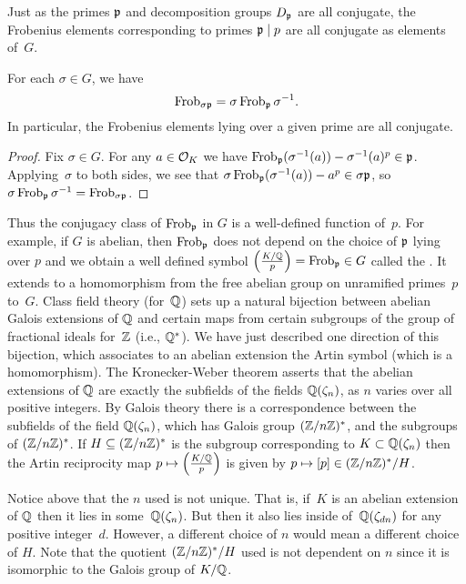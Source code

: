 Just as the primes $\mathfrak{p}$ and decomposition groups $D_{\mathfrak{p}}$ are all
conjugate, the Frobenius elements corresponding to primes
$\mathfrak{p}\mid p$ are all conjugate as elements of~$G$.

\begin{proposition}
For each $\sigma \in G$, we have
$$
 \operatorname{Frob}_{\sigma\mathfrak{p}} = \sigma\operatorname{Frob}_{\mathfrak{p}}\sigma^{-1}.
$$
In particular, the Frobenius elements lying over a given
prime are all conjugate.
\end{proposition}
\begin{proof}
Fix $\sigma\in G$. For any $a\in\mathcal{O}_K$ we have
$\operatorname{Frob}_{\mathfrak{p}}(\sigma^{-1}(a)) - \sigma^{-1}(a)^p \in \mathfrak{p}$.
Applying~$\sigma$ to both sides, we see that
$\sigma\operatorname{Frob}_{\mathfrak{p}}(\sigma^{-1}(a)) - a^p \in \sigma\mathfrak{p}$,
so $\sigma\operatorname{Frob}_{\mathfrak{p}}\sigma^{-1} = \operatorname{Frob}_{\sigma \mathfrak{p}}$.
\end{proof}

Thus the conjugacy class of $\operatorname{Frob}_{\mathfrak{p}}$ in $G$ is a well-defined
function of~$p$.  For example, if $G$ is abelian, then $\operatorname{Frob}_{\mathfrak{p}}$ does
not depend on the choice of $\mathfrak{p}$ lying over $p$ and we obtain a well
defined symbol $\left(\frac{K/\mathbb{Q}}{p}\right) =\operatorname{Frob}_{\mathfrak{p}}\in G$ called the .  It extends to a homomorphism from the free abelian
group on unramified primes~$p$ to~$G$.
Class field theory (for~$\mathbb{Q}$) sets up a natural bijection
between abelian Galois extensions of $\mathbb{Q}$ and certain maps from
certain subgroups of the group of fractional ideals for~$\mathbb{Z}$ (i.e., $\mathbb{Q}^*$).
  We have
just described one direction of this bijection, which associates to an
abelian extension the Artin symbol (which is a homomorphism).
The Kronecker-Weber theorem asserts that the abelian extensions of
$\mathbb{Q}$ are exactly the subfields of the fields $\mathbb{Q}(\zeta_n)$, as $n$
varies over all positive integers.  By Galois theory there is a
correspondence between the subfields of the field $\mathbb{Q}(\zeta_n)$,
which has Galois group $(\mathbb{Z}/n\mathbb{Z})^*$, and the subgroups of $(\mathbb{Z}/n\mathbb{Z})^*$.
If $H \subseteq (\mathbb{Z}/n\mathbb{Z})^*$ is the subgroup corresponding to
$K \subset \mathbb{Q}(\zeta_n)$ then the Artin reciprocity map
$p\mapsto \left(\frac{K/\mathbb{Q}}{p}\right)$ is given by $p\mapsto [p]\in (\mathbb{Z}/n\mathbb{Z})^*/H$.

\begin{remark}
	Notice above that the $n$ used is not unique. That is,
	if~$K$ is an abelian extension of $\mathbb{Q}$ then it lies in some~$\mathbb{Q}(\zeta_n)$.
	But then it also lies inside of~$\mathbb{Q}(\zeta_{dn})$ for any
	positive integer~$d$. However, a different choice of $n$
	would mean a different choice of $H$. Note that the
	quotient $(\mathbb{Z}/n\mathbb{Z})^*/H$ used is not dependent on $n$
	since it is isomorphic to the Galois group of $K/\mathbb{Q}$.
\end{remark}

